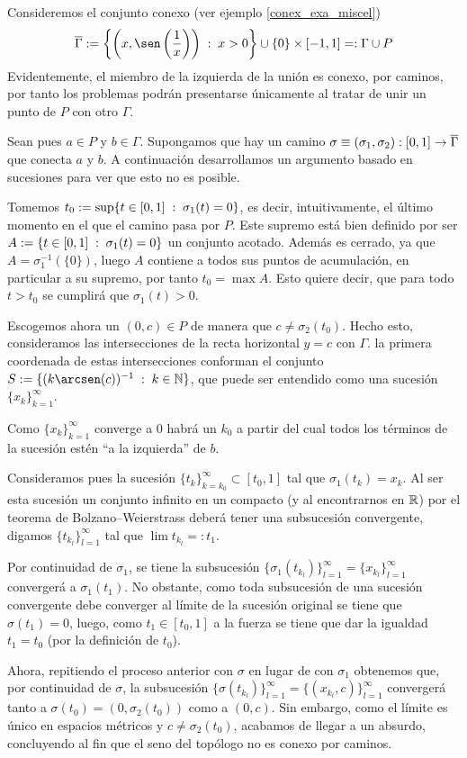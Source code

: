 \begin{exa}
	\label{cam_exa_seno}
	Consideremos el conjunto conexo (ver ejemplo \ref{conex_exa_miscel}) \[\adher{\Gamma}:=\left\{\left(x,\sen\left(\frac{1}{x}\right)\right)\midc x>0\right\}\cup\{0\}\times[-1,1]=:\Gamma\cup P\]
	Evidentemente, el miembro de la izquierda de la unión es conexo, por caminos, por tanto los problemas podrán presentarse únicamente al tratar de unir un punto de $P$ con otro $\Gamma$.
	
	Sean pues $a\in P$ y $b\in \Gamma$. Supongamos que hay un camino $\sigma\equiv(\sigma_1,\sigma_2):[0,1]\to\overline{\Gamma}$ que conecta $a$ y $b$. A continuación desarrollamos un argumento basado en sucesiones para ver que esto no es posible.
	
	Tomemos $t_0:=\sup\{t\in[0,1]\;:\; \sigma_1(t)=0\}$, es decir, intuitivamente, el último momento en el que el camino pasa por $P$. Este supremo está bien definido por ser $A:=\{t\in[0,1]\;:\; \sigma_1(t)=0\}$ un conjunto acotado. Además es cerrado, ya que $A=\sigma_1^{-1}(\{0\})$, luego $A$ contiene a todos sus puntos de acumulación, en particular a su supremo, por tanto $t_0=\max A$. Esto quiere decir, que para todo $t>t_0$ se cumplirá que $\sigma_1(t)>0$.
	
	Escogemos ahora un $(0,c)\in P$ de manera que $c\not=\sigma_2(t_0)$. Hecho esto, consideramos las intersecciones de la recta horizontal $y=c$ con $\Gamma$. la primera coordenada de estas intersecciones conforman el conjunto $S:=\{(k\arcsen(c))^{-1}\midc k\in\N\}$, que puede ser entendido como una sucesión $\{x_k\}_{k=1}^\infty$.
	
	Como $\{x_k\}_{k=1}^\infty$ converge a $0$ habrá un $k_0$ a partir del cual todos los términos de la sucesión estén ``a la izquierda'' de $b$.
	
	Consideramos pues la sucesión $\{t_k\}_{k=k_0}^\infty\subset[t_0,1]$ tal que $\sigma_1(t_k)=x_k$. Al ser esta sucesión un conjunto infinito en un compacto (y al encontrarnos en $\mathbb{R}$) por el teorema de Bolzano--Weierstrass deberá tener una subsucesión convergente, digamos $\{t_{k_l}\}_{l=1}^\infty$ tal que $\lim t_{k_l}=:t_1$.
	
	Por continuidad de $\sigma_1$, se tiene la subsucesión $\{\sigma_1(t_{k_l})\}_{l=1}^\infty=\{x_{k_l}\}_{l=1}^\infty$ convergerá a $\sigma_1(t_1)$. No obstante, como toda subsucesión de una sucesión convergente debe converger al límite de la sucesión original se tiene que $\sigma(t_1)=0$, luego, como $t_1\in[t_0,1]$ a la fuerza se tiene que dar la igualdad $t_1 = t_0$ (por la definición de $t_0$).
	
	Ahora, repitiendo el proceso anterior con $\sigma$ en lugar de con $\sigma_1$ obtenemos que, por continuidad de $\sigma$, la subsucesión $\{\sigma(t_{k_l})\}_{l=1}^\infty=\{(x_{k_l},c)\}_{l=1}^\infty$ convergerá tanto a $\sigma(t_0)=(0,\sigma_2(t_0))$ como a $(0,c)$. Sin embargo, como el límite es único en espacios métricos y $c\not=\sigma_2(t_0)$, acabamos de llegar a un absurdo, concluyendo al fin que el seno del topólogo no es conexo por caminos.
\end{exa}

